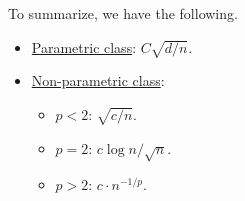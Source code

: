 \begin{remark}
	To summarize, we have the following.
	\begin{itemize}
		\item \hyperref[def:parametric]{Parametric class}: \(C \sqrt{d / n} \).
		\item \hyperref[def:non-parametric]{Non-parametric class}:
		      \begin{itemize}
			      \item \(p < 2\): \(\sqrt{c / n} \).
			      \item \(p = 2\): \(c \log n / \sqrt{n} \).
			      \item \(p > 2\): \(c\cdot n^{-1 / p}\).
		      \end{itemize}
	\end{itemize}
\end{remark}


